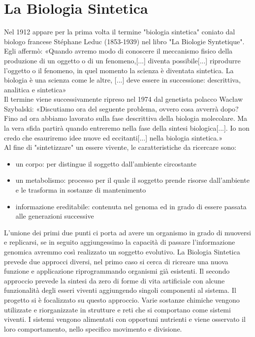 \section{La Biologia Sintetica}
\label{sec:artificial}
Nel 1912 appare per la prima volta il termine "biologia sintetica" coniato dal biologo francese Stéphane Leduc (1853-1939) nel libro "La Biologie Syntetique". Egli affermò: «Quando avremo modo di conoscere il meccanismo fisico della produzione di un oggetto o di un fenomeno,[...] diventa possibile[...] riprodurre l'oggetto o il fenomeno, in quel momento la scienza è diventata sintetica. La biologia è una scienza come le altre, [...] deve essere in successione: descrittiva, analitica e sintetica»
\\Il termine viene successivamente ripreso nel 1974 dal genetista polacco Wacław Szybalski: «Discutiamo ora del seguente problema, ovvero cosa avverrà dopo? Fino ad ora abbiamo lavorato sulla fase descrittiva della biologia molecolare. Ma la vera sfida partirà quando entreremo nella fase della sintesi biologica[...]. Io non credo che esauriremo idee nuove ed eccitanti[...] nella biologia sintetica.» \cite{waclaw} 
\\Al fine di "sintetizzare" un essere vivente, le caratteristiche da ricercare sono:
\begin{itemize}
\item un corpo: per distingue il soggetto dall'ambiente circostante
\item un metabolismo: processo per il quale il soggetto prende risorse dall'ambiente e le trasforma in sostanze di mantenimento
\item informazione ereditabile: contenuta nel genoma ed in grado di essere passata alle generazioni successive
\end{itemize}
L'unione dei primi due punti ci porta ad avere un organismo in grado di muoversi e replicarsi, se in seguito aggiungessimo la capacità di passare l'informazione genomica avremmo così realizzato un soggetto evolutivo.
La Biologia Sintetica prevede due approcci diversi, nel primo caso si cerca di ricreare una nuova funzione e applicazione riprogrammando organismi già esistenti. Il secondo approccio prevede la sintesi da zero di forme di vita artificiale con alcune funzionalità degli esseri viventi aggiungendo singoli componenti al sistema. Il progetto si è focalizzato su questo approccio. Varie sostanze chimiche vengono utilizzate e riorganizzate in strutture e reti che si comportano come sistemi viventi. I sistemi vengono alimentati con opportuni nutrienti e viene osservato il loro comportamento, nello specifico movimento e divisione.   

